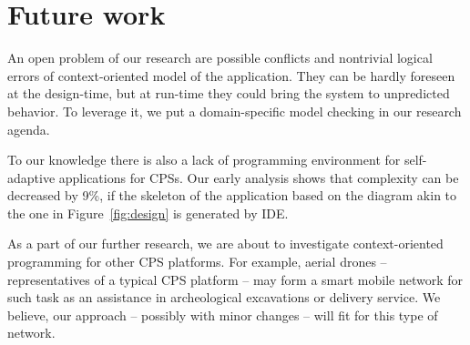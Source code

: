 \section{Future work}\label{sec:future}

An open problem of our research are possible conflicts and nontrivial logical
errors of context-oriented model of the application. They can be hardly foreseen
at the design-time, but at run-time they could bring the system to unpredicted
behavior. To leverage it, we put a domain-specific model checking in our
research agenda.

To our knowledge there is also a lack of programming environment for
self-adaptive applications for CPSs. Our early analysis shows that complexity
can be decreased by 9\%, if the skeleton of the application based on the diagram
akin to the one in Figure~\ref{fig:design} is generated by IDE.

As a part of our further research, we are about to investigate context-oriented
programming for other CPS platforms. For example, aerial drones --
representatives of a typical CPS platform -- may form a smart mobile network for
such task as an assistance in archeological excavations or delivery service. We
believe, our approach -- possibly with minor changes -- will fit for this type of
network.
